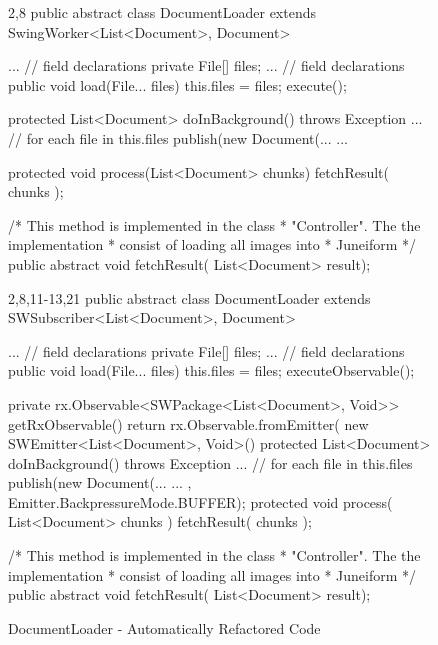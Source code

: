 \begin{figure}[H]
\begin{minipage}{0.45\textwidth}
\begin{sourcecode}
\begin{javacode}{2,8}
public abstract class DocumentLoader 
	extends SwingWorker<List<Document>, Document> {
    ... // field declarations
    private File[] files;
    ... // field declarations
    public void load(File... files) {
        this.files = files;
        execute();
    }

    protected List<Document> doInBackground() 
    	throws Exception {
        ... // for each file in this.files
        publish(new Document(...
        ...
    }

    protected void process(List<Document> chunks){
        fetchResult( chunks );
    }

	/* This method is implemented in the class 
	 * "Controller". The the implementation 
	 * consist of loading all images into 
	 * Juneiform
	*/
    public abstract void fetchResult(
    	List<Document> result);
}
\end{javacode}
\caption{DocumentLoader - Modified Code}
\label{code:example-original}
\end{sourcecode}
\end{minipage}\hspace{0.7cm}
\begin{minipage}{0.51\textwidth}
\begin{sourcecode}
\begin{javacode}{2,8,11-13,21}
public abstract class DocumentLoader 
	extends SWSubscriber<List<Document>, Document> {
    ... // field declarations
    private File[] files;
    ... // field declarations
    public void load(File... files) {
        this.files = files;
        executeObservable();
    }

    private rx.Observable<SWPackage<List<Document>, Void>> 
    	getRxObservable() {
				return rx.Observable.fromEmitter(
				new SWEmitter<List<Document>, Void>() {
				protected List<Document> doInBackground() 
					throws Exception {
				        ... // for each file in this.files
				        publish(new Document(...
				        ...
				}
			}, Emitter.BackpressureMode.BUFFER);
	}
	protected void process( List<Document> chunks ){
		fetchResult( chunks );
	}

	/* This method is implemented in the class 
	 * "Controller". The the implementation 
	 * consist of loading all images into 
	 * Juneiform
	*/
    public abstract void fetchResult(
    	List<Document> result);
}
\end{javacode}
\caption{DocumentLoader - Automatically Refactored Code}
\label{code:example-refactored}
\end{sourcecode}
\end{minipage}
\end{figure}